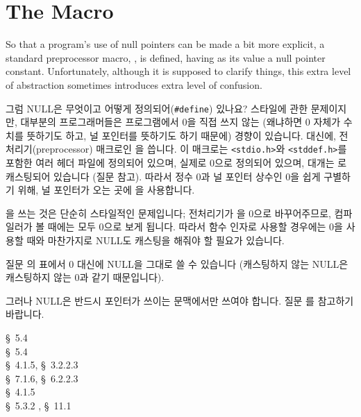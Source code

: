 \section{The  Macro}
So that a program's use of null pointers can be made a bit more explicit,
a standard preprocessor macro, , is defined, having as its value a
null pointer constant. Unfortunately, although it is supposed to clarify
things, this extra level of abstraction sometimes introduces extra level of
confusion.

\begin{faq}
	그럼 NULL은 무엇이고 어떻게 정의되어(\verb+#define+) 있나요?
\A	
	스타일에 관한 문제이지만, 대부분의 프로그래머들은 프로그램에서
	0을 직접 쓰지 않는 (왜냐하면 0 자체가 수치를 뜻하기도 하고, 널 포인터를
	뜻하기도 하기 때문에) 경향이 있습니다.  대신에, 
	전처리기(preprocessor) 매크로인 을 씁니다.
	이 매크로는 \verb+<stdio.h>+와 \verb+<stddef.h>+를 포함한 여러 헤더
	파일에 정의되어 있으며, 실제로 0으로 정의되어 있으며, 대개는 
	로 캐스팅되어 있습니다 (질문  참고). 
	따라서 정수 0과 널 포인터 상수인 0을 쉽게 구별하기 위해, 널
	포인터가 오는 곳에 을 사용합니다.

	을 쓰는 것은 단순히 스타일적인 문제입니다; 전처리기가
	을 0으로 바꾸어주므로, 컴파일러가 볼 때에는 모두 0으로
	보게 됩니다.  따라서 함수 인자로 사용할 경우에는 0을 사용할
	때와 마찬가지로 NULL도 캐스팅을 해줘야 할 필요가 있습니다.

	질문 의 표에서 0 대신에 NULL을 그대로 쓸 수 있습니다 (캐스팅하지
	않는 NULL은 캐스팅하지 않는 0과 같기 때문입니다).

	그러나 NULL은 반드시 포인터가 쓰이는 문맥에서만 쓰여야 합니다.
	질문 를 참고하기 바랍니다.

\R	\cite{kr1} \S\ 5.4  \\
	\cite{kr2} \S\ 5.4  \\
	\cite{ansi} \S\ 4.1.5, \S\ 3.2.2.3 \\
	\cite{c89} \S\ 7.1.6, \S\ 6.2.2.3 \\
	\cite{rationale} \S\ 4.1.5 \\
	\cite{hs} \S\ 5.3.2 , \S\ 11.1 
\end{faq}

